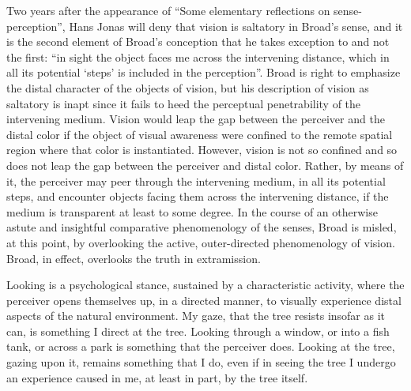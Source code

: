 \documentclass[12pt]{article}
\begin{document}
Two years after the appearance of ``Some elementary reflections on sense-per\-cep\-tion'', Hans Jonas will deny that vision is saltatory in Broad’s sense, and it is the second element of Broad's conception that he takes exception to and not the first: ``in sight the object faces me across the intervening distance, which in all its potential `steps' is included in the perception''. Broad is right to emphasize the distal character of the objects of vision, but his description of vision as saltatory is inapt since it fails to heed the perceptual penetrability of the intervening medium. Vision would leap the gap between the perceiver and the distal color if the object of visual awareness were confined to the remote spatial region where that color is instantiated. However, vision is not so confined and so does not leap the gap between the perceiver and distal color. Rather, by means of it, the perceiver may peer through the intervening medium, in all its potential steps, and encounter objects facing them across the intervening distance, if the medium is transparent at least to some degree. In the course of an otherwise astute and insightful comparative phenomenology of the senses, Broad is misled, at this point, by overlooking the active, outer-directed phenomenology of vision. Broad, in effect, overlooks the truth in extramission.

Looking is a psychological stance, sustained by a characteristic activity, where the perceiver opens themselves up, in a directed manner, to visually experience distal aspects of the natural environment. My gaze, that the tree resists insofar as it can, is something I direct at the tree. Looking through a window, or into a fish tank, or across a park is something that the perceiver does. Looking at the tree, gazing upon it, remains something that I do, even if in seeing the tree I undergo an experience caused in me, at least in part, by the tree itself.

%
\end{document}
